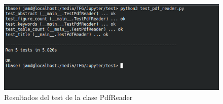 \documentclass[../main.tex]{subfiles}
\begin{document}
\begin{figure}[h]
	\centering
	\includegraphics[width=0.9\linewidth]{../images/test-pdf-reader}
	\caption{Resultados del test de la clase PdfReader}
	\label{fig:test-pdf-reader}
\end{figure}
\end{document}
